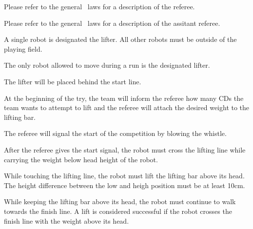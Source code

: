 \documentclass[12pt]{hurocup}
\begin{document}

Please refer to the general \HuroCup\ laws for a description of
the referee.


Please refer to the general \HuroCup\ laws for a description of
the assitant referee.


\begin{lawlist}[WL]

\item A single robot is designated the lifter. All other robots
  must be outside of the playing field.

\item The only robot allowed to move during a run is the
  designated lifter.

\item The lifter will be placed behind the start line.

\item At the beginning of the try, the team will inform the
 referee how many CDs the team wants to attempt to lift and the
 referee will attach the desired weight to the lifting bar.

\item The referee will signal the start of the competition by blowing
  the whistle.

\item After the referee gives the start signal, the robot must cross
 the lifting line while carrying the weight below head height of the
 robot.

\item While touching the lifting line, the robot must lift the lifting
 bar above its head. The height difference between the low and heigh
 position must be at least 10cm.

\item While keeping the lifting bar above its head, the robot must
 continue to walk towards the finish line. A lift is considered
 successful if the robot crosses the finish line with the weight above
 its head.


\end{lawlist}
\end{document}
